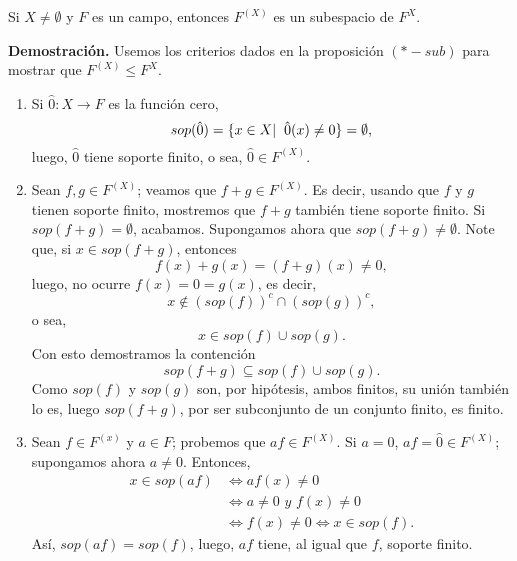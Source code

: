\begin{prop}
Si $X \neq \emptyset$ y $F$ es un campo, entonces
$F^{(X)}$ es un subespacio de $F^{X}$.
\end{prop}
\noindent
\textbf{Demostración.}
Usemos los criterios dados en la proposición $(*-sub)$
para mostrar que $F^{(X)} \leq F^{X}$.
\begin{enumerate}
	\item Si $\hat{0}: X \longrightarrow F$ es la función
	cero, 
	\[
	sop(\hat{0}) = \{ x \in X  | \hspace{0.2cm} \hat{0}(x) \neq 0\}
	= \emptyset,
	\]
	luego, $\hat{0}$ tiene soporte finito, o sea, 
	$\hat{0} \in F^{(X)}$.
	
	\item Sean $f, g \in F^{(X)}$; veamos que $f + g \in F^{(X)}$.
	Es decir, usando que $f$ y $g$ tienen soporte finito, mostremos
	que $f+g$ también tiene soporte finito.
	Si $sop(f + g) = \emptyset$, acabamos. Supongamos ahora
	que $sop(f+g) \neq \emptyset$. Note que, si 
	$x \in sop(f+g)$, entonces
	\[
	f(x) + g(x) = (f+g)(x) \neq 0,
	\]	
	luego, no ocurre $f(x) = 0 = g(x)$, es decir,
	\[
	x \not\in (sop(f))^{c} \cap (sop(g))^{c},
	\]
	o sea, 
	\[
	x \in sop(f) \cup sop(g).
	\]
	Con esto demostramos la contención
	\[
	sop(f+g) \subseteq sop(f) \cup sop(g).
	\]
	Como $sop(f)$ y $sop(g)$ son, por hipótesis, ambos
	finitos, su unión también lo es, luego
	$sop(f+g)$, por ser subconjunto de un conjunto finito,
	es finito.
	
	\item Sean $f \in F^{(x)}$ y $a \in F$; probemos que
	$af \in F^{(X)}$. Si $a = 0$, 
	$a f = \hat{0} \in F^{(X)}$; supongamos ahora $a \neq 0$.
	Entonces,
	\begin{align*}
	x \in sop(af) & \Leftrightarrow  af(x) \neq 0 \\
	& \Leftrightarrow  a \neq 0 \textit{ y } f(x) \neq 0 \\
	& \Leftrightarrow  f(x) \neq 0 
	\Leftrightarrow x \in sop(f).
	\end{align*}
	Así, $sop(a f) = sop(f)$, luego, $af$ tiene, al igual
	que $f$, soporte finito.
\end{enumerate}

\QEDB
\vspace{0.2cm}

